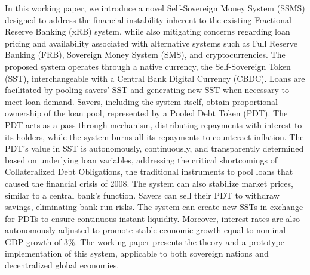 In this working paper, we introduce a novel Self-Sovereign Money System (SSMS) designed to address the financial instability inherent to the existing Fractional Reserve Banking (xRB) system, while also mitigating concerns regarding loan pricing and availability associated with alternative systems such as Full Reserve Banking (FRB), Sovereign Money System (SMS), and cryptocurrencies. The proposed system operates through a native currency, the Self-Sovereign Token (SST), interchangeable with a Central Bank Digital Currency (CBDC). Loans are facilitated by pooling savers' SST and generating new SST when necessary to meet loan demand. Savers, including the system itself, obtain proportional ownership of the loan pool, represented by a Pooled Debt Token (PDT). The PDT acts as a pass-through mechanism, distributing repayments with interest to its holders, while the system burns all its repayments to counteract inflation. The PDT's value in SST is autonomously, continuously, and transparently determined based on underlying loan variables, addressing the critical shortcomings of Collateralized Debt Obligations, the traditional instruments to pool loans that caused the financial crisis of 2008. The system can also stabilize market prices, similar to a central bank's function. Savers can sell their PDT to withdraw savings, eliminating bank-run risks. The system can create new SSTs in exchange for PDTs to ensure continuous instant liquidity. Moreover, interest rates are also autonomously adjusted to promote stable economic growth equal to nominal GDP growth of 3\%. The working paper presents the theory and a prototype implementation of this system, applicable to both sovereign nations and decentralized global economies.